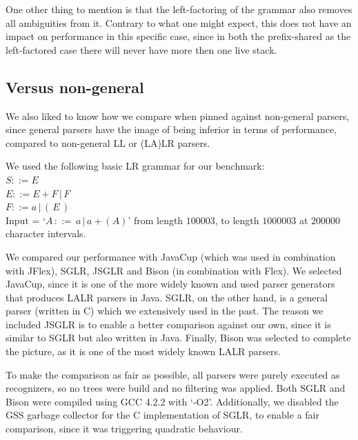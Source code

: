 \documentclass[a4paper,10pt]{article}
\begin{document}
One other thing to mention is that the left-factoring of the grammar also removes all ambiguities from it. Contrary to what one might expect, this does not have an impact on performance in this specific case, since in both the prefix-shared as the left-factored case there will never have more then one live stack.

\subsection{Versus non-general}

We also liked to know how we compare when pinned against non-general parsers, since general parsers have the image of being inferior in terms of performance, compared to non-general LL or (LA)LR parsers.

We used the following basic LR grammar for our benchmark:\\
$S ::= E$\\
$E ::= E + F\,|\,F$\\
$F ::= a\,|\,(\,E\,)$\\
Input = `$A\,::=\,a\,|\,a+(A)$' from length $100003$, to length $1000003$ at $200000$ character intervals.

We compared our performance with JavaCup\cite{javacup} (which was used in combination with JFlex\cite{jflex}), SGLR\cite{sglr}, JSGLR\cite{jsglr} and Bison\cite{bison} (in combination with Flex\cite{flex}). We selected JavaCup, since it is one of the more widely known and used parser generators that produces LALR parsers in Java. SGLR, on the other hand, is a general parser (written in C) which we extensively used in the past. The reason we included JSGLR is to enable a better comparison against our own, since it is similar to SGLR but also written in Java. Finally, Bison was selected to complete the picture, as it is one of the most widely known LALR parsers.

To make the comparison as fair as possible, all parsers were purely executed as recognizers, so no trees were build and no filtering was applied. Both SGLR and Bison were compiled using GCC 4.2.2 with `-O2'. Additionally, we disabled the GSS garbage collector for the C implementation of SGLR, to enable a fair comparison, since it was triggering quadratic behaviour.
\end{document}
